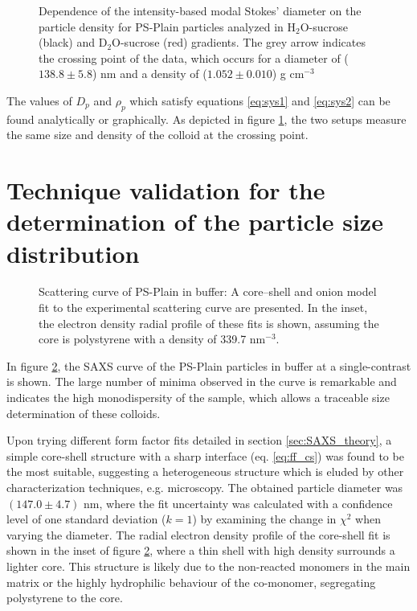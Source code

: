\begin{figure}
	\begin{center}
		
	\end{center}
	\caption{Dependence of the intensity-based modal Stokes' diameter on the particle density for PS-Plain particles analyzed in H$_2$O-sucrose (black) and D$_2$O-sucrose (red) gradients. The grey arrow indicates the crossing point of the data, which occurs for a diameter of ($138.8\pm5.8$) nm and a density of ($1.052\pm0.010$) g cm$^{-3}$}
	\label{fig:DCSCombinedStokes}
\end{figure}

The values of $D_p$ and $\rho_p$ which satisfy equations \ref{eq:sys1} and \ref{eq:sys2} can be found analytically or graphically. As depicted in figure \ref{fig:DCSCombinedStokes}, the two setups measure the same size and density of the colloid at the crossing point.

\section{Technique validation for the determination of the particle size distribution}
\label{sec:size_validation}

\begin{figure}
	\begin{center}
		
	\end{center}
	\caption{Scattering curve of PS-Plain in buffer: A core–shell and onion model fit to the experimental scattering curve are presented. In the inset, the electron density radial profile
	\label{fig:PSPlainSingleContrastSAXS}
of these fits is shown, assuming the core is polystyrene with a density of 339.7 nm$^{-3}$.}
\end{figure}

In figure \ref{fig:PSPlainSingleContrastSAXS}, the SAXS curve of the  PS-Plain particles in buffer at a single-contrast is shown. The large number of minima observed in the curve is remarkable and indicates the high monodispersity of the sample, which allows a traceable size determination of these colloids.

Upon trying different form factor fits detailed in section \ref{sec:SAXS_theory}, a simple core-shell structure with a sharp interface (eq. \ref{eq:ff_cs}) was found to be the most suitable, suggesting a heterogeneous structure which is eluded by other characterization techniques, e.g. microscopy. The obtained particle diameter was $(147.0\pm4.7)$ nm, where the fit uncertainty was calculated with a confidence level of one standard deviation ($k=1$) by examining the change in $\chi^2$ when varying the diameter. The radial electron density profile of the core-shell fit is shown in the inset of figure \ref{fig:PSPlainSingleContrastSAXS}, where a thin shell with high density surrounds a lighter core. This structure is likely due to the non-reacted monomers in the main matrix or the highly hydrophilic behaviour of the co-monomer, segregating polystyrene to the core.

